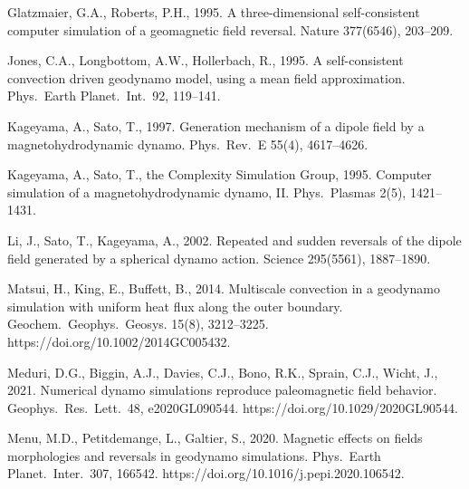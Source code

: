\begin{list}
Glatzmaier, G.A., Roberts, P.H., 1995. A three-dimensional self-consistent computer simulation of a geomagnetic field reversal. Nature 377(6546), 203--209.
%
\item
Jones, C.A., Longbottom, A.W., Hollerbach, R., 1995. A self-consistent convection driven geodynamo model, using a mean field approximation. Phys.\ Earth Planet.\ Int.\ 92, 119--141.
%
\item
Kageyama, A., Sato, T., 1997. Generation mechanism of a dipole field by a magnetohydrodynamic dynamo. Phys.\ Rev.\ E 55(4), 4617--4626.
%
\item
Kageyama, A., Sato, T., the Complexity Simulation Group, 1995. Computer simulation of a magnetohydrodynamic dynamo, II. Phys.\ Plasmas 2(5), 1421--1431.
%
\item
Li, J., Sato, T., Kageyama, A., 2002. Repeated and sudden reversals of the dipole field generated by a spherical dynamo action. Science 295(5561), 1887--1890.
%
%
\item
Matsui, H., King, E., Buffett, B., 2014. Multiscale convection in a geodynamo simulation with uniform heat flux along the outer boundary. Geochem.\ Geophys.\ Geosys. 15(8), 3212--3225. https://doi.org/10.1002/2014GC005432.
%
%
\item
Meduri, D.G., Biggin, A.J., Davies, C.J., Bono, R.K., Sprain, C.J., Wicht, J., 2021. Numerical dynamo simulations reproduce paleomagnetic field behavior. Geophys.\ Res.\ Lett.\ 48, e2020GL090544. https://doi.org/10.1029/2020GL90544.
%
\item
Menu, M.D., Petitdemange, L., Galtier, S., 2020. Magnetic effects on fields morphologies and reversals in geodynamo simulations. Phys.\ Earth Planet.\ Inter.\ 307, 166542. https://doi.org/10.1016/j.pepi.2020.106542.

\end{list}
